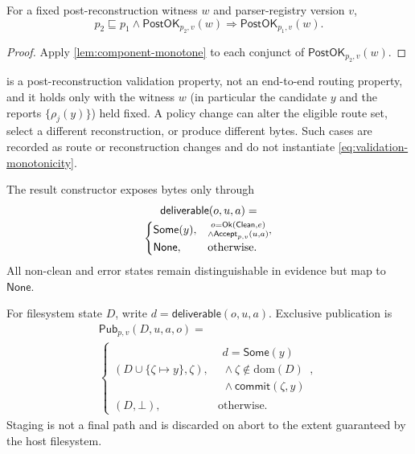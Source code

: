 \begin{theorem}
\label{thm:validation-monotonicity}
For a fixed post-reconstruction witness \(w\) and parser-registry version
\(v\),
\begin{equation}
  p_2\sqsubseteq p_1\land\mathsf{PostOK}_{p_2,v}(w)
  \Longrightarrow \mathsf{PostOK}_{p_1,v}(w).
  \label{eq:validation-monotonicity}
\end{equation}
\end{theorem}

\begin{proof}
Apply \cref{lem:component-monotone} to each conjunct of
\(\mathsf{PostOK}_{p_2,v}(w)\).
\end{proof}

 is a post-reconstruction validation
property, not an end-to-end routing property, and it holds only with the
witness \(w\) (in particular the candidate \(y\) and the reports
\(\{\rho_j(y)\}\)) held fixed. A policy change can alter the eligible route set,
select a different reconstruction, or produce different bytes. Such cases are
recorded as route or reconstruction changes and do not instantiate
\cref{eq:validation-monotonicity}.

The result constructor exposes bytes only through
\begin{equation}
  \begin{gathered}
  \mathsf{deliverable}(o,u,a)=\\[-0.25ex]
  \begin{cases}
    \mathsf{Some}(y), &
      \substack{o=\mathsf{Ok}(\mathsf{Clean},e)\\
      {}\land\mathsf{Accept}_{p,v}(u,a)},\\
    \mathsf{None}, & \text{otherwise}.
  \end{cases}
  \end{gathered}
  \label{eq:clean-only-delivery}
\end{equation}
All non-clean and error states remain distinguishable in evidence but map to
\(\mathsf{None}\).

For filesystem state \(D\), write
\(d=\mathsf{deliverable}(o,u,a)\). Exclusive publication is
\begin{equation}
 \begin{gathered}
 \mathsf{Pub}_{p,v}(D,u,a,o)=\\[-0.25ex]
 \begin{cases}
  (D\cup\{\zeta\mapsto y\},\zeta),&
   \substack{d=\mathsf{Some}(y)\\
   {}\land\zeta\notin\mathrm{dom}(D)\\
   {}\land\mathsf{commit}(\zeta,y)},\\
  (D,\bot),&\text{otherwise}.
 \end{cases}
 \end{gathered}
  \label{eq:publish-transition}
\end{equation}
Staging is not a final path and is discarded on abort to the extent guaranteed
by the host filesystem.

